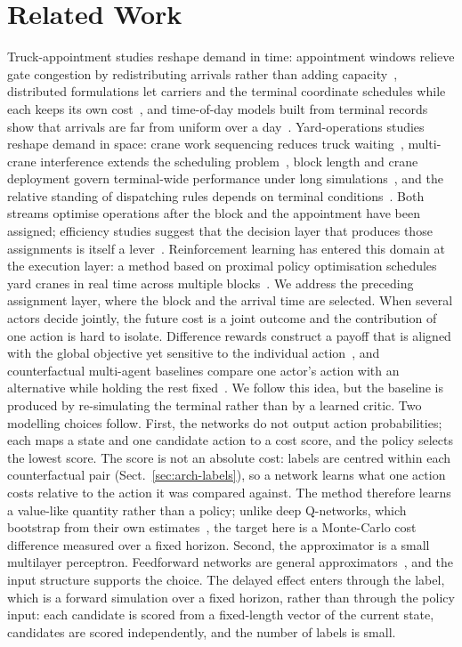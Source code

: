 \documentclass[a4paper]{llncs}
\begin{document}
\section{Related Work}
\label{sec:related}
Truck-appointment studies reshape demand in time: appointment windows
relieve gate congestion by redistributing arrivals rather than adding
capacity~\cite{ref4}, distributed formulations let carriers and the
terminal coordinate schedules while each keeps its own
cost~\cite{ref6}, and time-of-day models built from terminal records
show that arrivals are far from uniform over a day~\cite{ref13}.
Yard-operations studies reshape demand in space: crane work sequencing
reduces truck waiting~\cite{ref7}, multi-crane interference extends the
scheduling problem~\cite{ref8}, block length and crane deployment govern
terminal-wide performance under long simulations~\cite{ref9}, and the
relative standing of dispatching rules depends on terminal
conditions~\cite{ref16}. Both streams optimise operations after
the block and the appointment have been assigned; efficiency studies
suggest that the decision layer that produces those assignments is
itself a lever~\cite{ref1}.
Reinforcement learning has entered this domain at the execution layer:
a method based on proximal policy optimisation schedules yard cranes
in real time across multiple blocks~\cite{ref19}. We address the preceding
assignment layer, where the block and the arrival time are selected.
When several actors decide jointly, the future cost is a joint outcome
and the contribution of one action is hard to isolate. Difference
rewards construct a payoff that is aligned with the global objective yet
sensitive to the individual action~\cite{ref10}, and counterfactual
multi-agent baselines compare one actor's action with an alternative
while holding the rest fixed~\cite{ref11}. We follow this idea, but the
baseline is produced by re-simulating the terminal rather than by a
learned critic.
Two modelling choices follow. First, the networks do not output action
probabilities; each maps a state and one candidate action to a cost
score, and the policy selects the lowest score. The score is not an
absolute cost: labels are centred within each counterfactual pair
(Sect.~\ref{sec:arch-labels}), so a network learns what one action costs
relative to the action it was compared against. The method
therefore learns a value-like quantity rather than a policy; unlike deep
Q-networks, which bootstrap from their own estimates~\cite{refmnih}, the
target here is a Monte-Carlo cost difference measured over a fixed
horizon. Second, the approximator is a small multilayer perceptron.
Feedforward networks are general approximators~\cite{refhornik}, and the
input structure supports the choice. The delayed effect enters through
the label, which is a forward simulation over a fixed horizon, rather
than through the policy input: each candidate is scored from a
fixed-length vector of the current state, candidates are scored
independently, and the number of labels is small.
\end{document}
